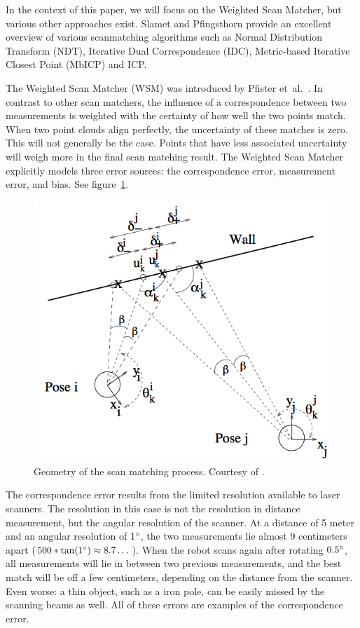 In the context of this paper, we will focus on the Weighted Scan Matcher, but various other approaches exist. Slamet and Pfingsthorn \cite{slamet2006manifoldslam} provide an excellent overview of various scanmatching algorithms such as Normal Distribution Transform (NDT), Iterative Dual Correspondence (IDC), Metric-based Iterative Closest Point (MbICP) and ICP.

The Weighted Scan Matcher (WSM) was introduced by Pfister et~al.\ \cite{pfister2002weighted}. In contrast to other scan matchers, the influence of a correspondence between two measurements is weighted with the certainty of how well the two points match. When two point clouds align perfectly, the uncertainty of these matches is zero. This will not generally be the case. Points that have less associated uncertainty will weigh more in the final scan matching result. The Weighted Scan Matcher explicitly models three error sources: the correspondence error, measurement error, and bias. See figure~\ref{fig:pfister2002}. 

\begin{figure}[ht]
  \begin{center}
    \includegraphics[scale=0.3]{images/slam/pfister2002.png}
  \end{center}
  \caption{Geometry of the scan matching process. Courtesy of \cite{pfister2002weighted}.}
  \label{fig:pfister2002}
\end{figure}

The correspondence error results from the limited resolution available to laser scanners. The resolution in this case is not the resolution in distance measurement, but the angular resolution of the scanner. At a distance of 5 meter and an angular resolution of 1$\degree$, the two measurements lie almost 9 centimeters apart ($500 * \tan(1\degree) \approx 8.7\dots$). When the robot scans again after rotating $0.5\degree$, all measurements will lie in between two previous measurements, and the best match will be off a few centimeters, depending on the distance from the scanner. Even worse: a thin object, such as a iron pole, can be easily missed by the scanning beams as well. All of these errors are examples of the correspondence error.

